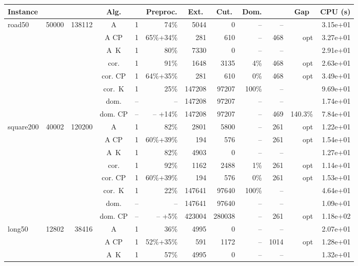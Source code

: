 \documentclass[11pt]{amsart}
\newenvironment{outdent}
{\begin{list}{}{\leftmargin-2cm\rightmargin\leftmargin}\centering\item\relax}
{\end{list}\ignorespacesafterend}
\theoremstyle{plain}
\theoremstyle{remark}
\begin{document}
\begin{table}
\begin{outdent}
\begin{small}
\begin{tabular}{|l|rrc|rr|rrr|rr|r|}
\hline
Instance 
& \multicolumn{1}{c}{} 
& \multicolumn{1}{c}{} 
& \multicolumn{1}{c|}{Alg.} 
& \multicolumn{1}{c}{} 
& \multicolumn{1}{c|}{Preproc.} 
& \multicolumn{1}{c}{Ext.} 
& \multicolumn{1}{c}{Cut.} 
& \multicolumn{1}{c|}{Dom.} 
& \multicolumn{1}{c}{} 
& \multicolumn{1}{c|}{Gap} 
& \multicolumn{1}{c|}{CPU (s)} \\
\hline
road50 & 50000 & 138112 & A & 1 & 74\% &5044 & 0 & -- & -- & & 3.15e+01 \\
&&&A CP & 1 & 65\%+34\% &281 & 610 & -- &468 & opt & 3.27e+01 \\
&&&A~K & 1 & 80\% &7330 & 0 & -- & -- & & 2.91e+01 \\
&&&cor. & 1 & 91\% &1648 & 3135 & 4\% &468 & opt & 2.63e+01 \\
&&&cor. CP & 1 & 64\%+35\% &281 & 610 & 0\% &468 & opt & 3.49e+01 \\
&&&cor.~K & 1 & 25\% &147208 & 97207 & 100\% & -- & & 9.69e+01 \\
&&&dom. & -- & --  &147208 & 97207 & -- & -- & & 1.74e+01 \\
&&&dom. CP & -- & -- +14\% &147208 & 97207 & -- &469 & 140.3\% & 7.84e+01 \\
\hline
square200 & 40002 & 120200 & A & 1 & 82\% &2801 & 5800 & -- &261 & opt & 1.22e+01 \\
&&&A CP & 1 & 60\%+39\% &194 & 576 & -- &261 & opt & 1.54e+01 \\
&&&A~K & 1 & 82\% &4903 & 0 & -- & -- & & 1.27e+01 \\
&&&cor. & 1 & 92\% &1162 & 2488 & 1\% &261 & opt & 1.14e+01 \\
&&&cor. CP & 1 & 60\%+39\% &194 & 576 & 0\% &261 & opt & 1.53e+01 \\
&&&cor.~K & 1 & 22\% &147641 & 97640 & 100\% & -- & & 4.64e+01 \\
&&&dom. & -- & --  &147641 & 97640 & -- & -- & & 1.09e+01 \\
&&&dom. CP & -- & -- +5\% &423004 & 280038 & -- &261 & opt & 1.18e+02 \\
\hline
long50 & 12802 & 38416 & A & 1 & 36\% &4995 & 0 & -- & -- & & 2.07e+01 \\
&&&A CP & 1 & 52\%+35\% &591 & 1172 & -- &1014 & opt & 1.28e+01 \\
&&&A~K & 1 & 57\% &4995 & 0 & -- & -- & & 1.32e+01 \\

\end{tabular}
\end{small}
\end{outdent}
\end{table}
\end{document}

